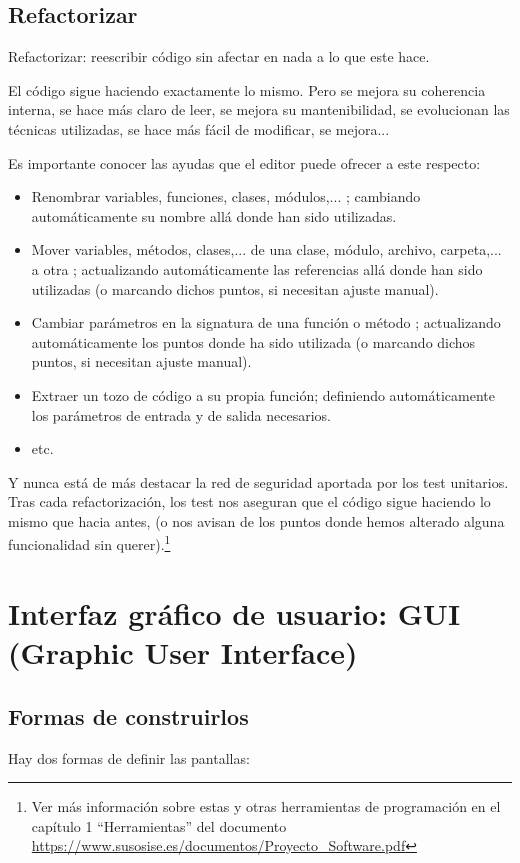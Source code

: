 \documentclass[spanish,12pt,a4paper,final,oneside]{book}
\begin{document}
\section{Refactorizar}
Refactorizar: reescribir código sin afectar en nada a lo que este hace.

El código sigue haciendo exactamente lo mismo. Pero se mejora su coherencia interna, se hace más claro de leer, se mejora su mantenibilidad, se evolucionan las técnicas utilizadas, se hace más fácil de modificar, se mejora...

Es importante conocer las ayudas que el editor puede ofrecer a este respecto:
\begin{itemize}
\item Renombrar variables, funciones, clases, módulos,... ; cambiando automáticamente su nombre allá donde han sido utilizadas.
\item Mover variables, métodos, clases,... de una clase, módulo, archivo, carpeta,... a otra ; actualizando automáticamente las referencias allá donde han sido utilizadas (o marcando dichos puntos, si necesitan ajuste manual).
\item Cambiar parámetros en la signatura de una función o método ; actualizando automáticamente los puntos donde ha sido utilizada (o marcando dichos puntos, si necesitan ajuste manual).
\item Extraer un tozo de código a su propia función; definiendo automáticamente los parámetros de entrada y de salida necesarios.
\item etc.
\end{itemize}

Y nunca está de más destacar la red de seguridad aportada por los test unitarios. Tras cada refactorización, los test nos aseguran que el código sigue haciendo lo mismo que hacia antes, (o nos avisan de los puntos donde hemos alterado alguna funcionalidad sin querer).\footnote{Ver más información sobre estas y otras herramientas de programación en el capítulo 1 ``Herramientas'' del documento \url{https://www.susosise.es/documentos/Proyecto_Software.pdf}}




\chapter{Interfaz gráfico de usuario: GUI \small{(Graphic User Interface)}}


\section{Formas de construirlos}
Hay dos formas de definir las pantallas:
\end{document}
